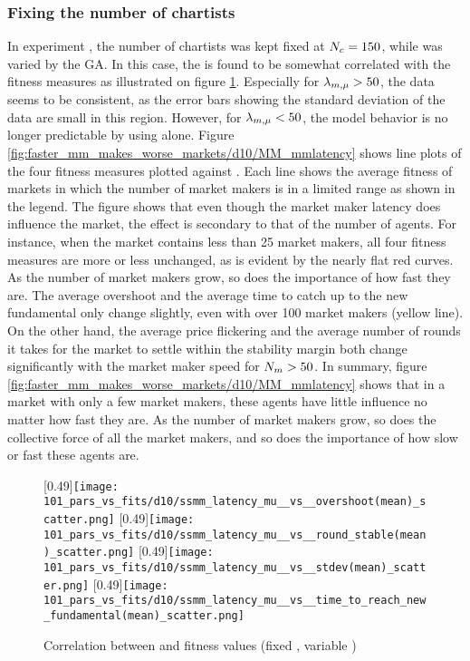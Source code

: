 \subsubsection*{Fixing the number of chartists}
In experiment \dten, the number of chartists was kept fixed at $N_{c} = 150$, while \ssmmnAgents was varied by the GA. In this case, the \ssmmlatencymu is found to be somewhat correlated with the fitness measures as illustrated on figure \ref{fig:d10_parvfit_ssmmlatencymu}. Especially for $\lambda_{m, \mu} > 50$, the data seems to be consistent, as the error bars showing the standard deviation of the data are small in this region. However, for $\lambda_{m, \mu} < 50$, the model behavior is no longer predictable by using \ssmmlatencymu alone. Figure \ref{fig:faster_mm_makes_worse_markets/d10/MM_mmlatency} shows line plots of the four fitness measures plotted against \ssmmlatencymu. Each line shows the average fitness of markets in which the number of market makers is in a limited range as shown in the legend. The figure shows that even though the market maker latency does influence the market, the effect is secondary to that of the number of agents. For instance, when the market contains less than 25 market makers, all four fitness measures are more or less unchanged, as is evident by the nearly flat red curves. As the number of market makers grow, so does the importance of how fast they are. The average overshoot and the average time to catch up to the new fundamental only change slightly, even with over 100 market makers (yellow line). On the other hand, the average price flickering and the average number of rounds it takes for the market to settle within the stability margin both change significantly with the market maker speed for $N_{m} > 50$. In summary, figure \ref{fig:faster_mm_makes_worse_markets/d10/MM_mmlatency} shows that in a market with only a few market makers, these agents have little influence no matter how fast they are. As the number of market makers grow, so does the collective force of all the market makers, and so does the importance of how slow or fast these agents are. 
\begin{figure}
	\centering
	[0.49\linewidth]{\texttt{[image: 101\_pars\_vs\_fits/d10/ssmm\_latency\_mu\_\_vs\_\_overshoot(mean)\_scatter.png]}}
	[0.49\linewidth]{\texttt{[image: 101\_pars\_vs\_fits/d10/ssmm\_latency\_mu\_\_vs\_\_round\_stable(mean)\_scatter.png]}}
	[0.49\linewidth]{\texttt{[image: 101\_pars\_vs\_fits/d10/ssmm\_latency\_mu\_\_vs\_\_stdev(mean)\_scatter.png]}}
	[0.49\linewidth]{\texttt{[image: 101\_pars\_vs\_fits/d10/ssmm\_latency\_mu\_\_vs\_\_time\_to\_reach\_new\_fundamental(mean)\_scatter.png]}}
	\caption{Correlation between \ssmmlatencymu{} and fitness values (fixed \scnAgents, variable \ssmmnAgents)}
	\label{fig:d10_parvfit_ssmmlatencymu}
\end{figure}
